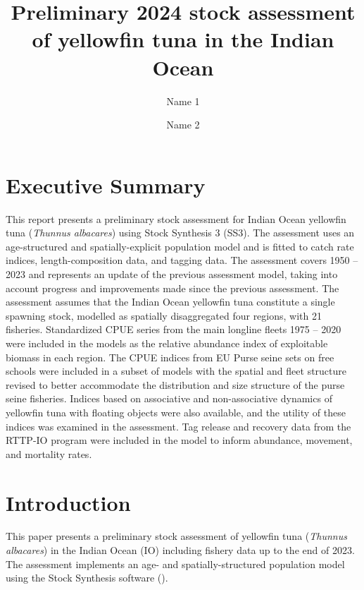 \documentclass[
]{scrartcl}
\title{Preliminary 2024 stock assessment of yellowfin tuna in the Indian
Ocean}
\author[1,2]{Name 1}
\author[2]{Name 2}
\affil[1]{AZTI, Marine Research, Basque Research and Technology Alliance
(BRTA), Txatxarramendi ugartea z/g, 48395 Sukarrieta (Bizkaia), Spain}
\affil[2]{Affiliation 2}
\date{}
\renewcommand*\contentsname{Table of contents}
\newcommand\contentsname{Table of contents}
\begin{document}
\maketitle

\renewcommand*\contentsname{Contents}
{
\hypersetup{linkcolor=blue}
\setcounter{tocdepth}{3}
\tableofcontents
}
\newpage{}

\section{Executive Summary}\label{executive-summary}

This report presents a preliminary stock assessment for Indian Ocean
yellowfin tuna (\emph{Thunnus albacares}) using Stock Synthesis 3 (SS3).
The assessment uses an age-structured and spatially-explicit population
model and is fitted to catch rate indices, length-composition data, and
tagging data. The assessment covers 1950 -- 2023 and represents an
update of the previous assessment model, taking into account progress
and improvements made since the previous assessment. The assessment
assumes that the Indian Ocean yellowfin tuna constitute a single
spawning stock, modelled as spatially disaggregated four regions, with
21 fisheries. Standardized CPUE series from the main longline fleets
1975 -- 2020 were included in the models as the relative abundance index
of exploitable biomass in each region. The CPUE indices from EU Purse
seine sets on free schools were included in a subset of models with the
spatial and fleet structure revised to better accommodate the
distribution and size structure of the purse seine fisheries. Indices
based on associative and non-associative dynamics of yellowfin tuna with
floating objects were also available, and the utility of these indices
was examined in the assessment. Tag release and recovery data from the
RTTP-IO program were included in the model to inform abundance,
movement, and mortality rates.

\section{Introduction}\label{introduction}

This paper presents a preliminary stock assessment of yellowfin tuna
(\emph{Thunnus albacares}) in the Indian Ocean (IO) including fishery
data up to the end of 2023. The assessment implements an age- and
spatially-structured population model using the Stock Synthesis software
().
\end{document}
